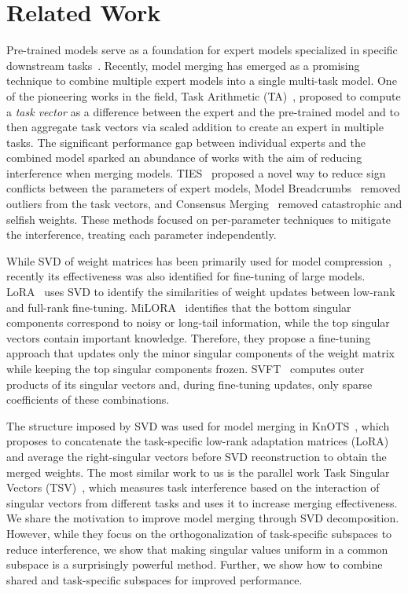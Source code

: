 \section{Related Work}
Pre-trained models serve as a foundation for expert models specialized in specific downstream tasks~\cite{radford2021learning}. Recently, model merging has emerged as a promising technique to combine multiple expert models into a single multi-task model.
One of the pioneering works in the field, Task Arithmetic (TA)~\cite{ilharco2023task}, proposed to compute a \textit{task vector} as a difference between the expert and the pre-trained model and to then aggregate task vectors via scaled addition to create an expert in multiple tasks. The significant performance gap between individual experts and the combined model sparked an abundance of works with the aim of reducing interference when merging models. TIES~\cite{yadav2023tiesmerging} proposed a novel way to reduce sign conflicts between the parameters of expert models, Model Breadcrumbs~\cite{davari2023model} removed outliers from the task vectors, and Consensus Merging~\cite{wang2024localizing} removed catastrophic and selfish weights. These methods focused on per-parameter techniques to mitigate the interference, treating each parameter independently.

While SVD of weight matrices has been primarily used for model compression~\cite{NIPS2014_2afe4567,KimPYCYS15}, recently its effectiveness was also identified for fine-tuning of large models. LoRA~\cite{hu2021lora} uses SVD to identify the similarities of weight updates between low-rank and full-rank fine-tuning.
MiLORA~\cite{milora} identifies that the bottom singular components correspond to noisy or long-tail information, while the top singular vectors contain important knowledge. Therefore, they propose a fine-tuning approach that updates only the minor singular components of the weight matrix while keeping the top singular components frozen. 
SVFT~\cite{svft} computes outer products of its singular vectors and, during fine-tuning updates, only sparse coefficients of these combinations.

The structure imposed by SVD was used for model merging in KnOTS~\cite{stoica2024knots}, which proposes to concatenate the task-specific low-rank adaptation matrices (LoRA) and average the right-singular vectors before SVD reconstruction to obtain the merged weights.
The most similar work to us is the parallel work Task Singular Vectors (TSV)~\cite{tsv}, which measures task interference based on the interaction of singular vectors from different tasks and uses it to increase merging effectiveness. We share the motivation to improve model merging through SVD decomposition. However, while they focus on the orthogonalization of task-specific subspaces to reduce interference, we show that making singular values uniform in a common subspace is a surprisingly powerful method. Further, we show how to combine shared and task-specific subspaces for improved performance.

